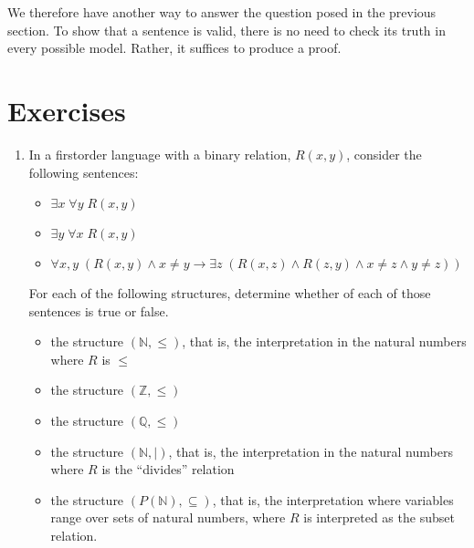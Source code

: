 \documentclass[letterpaper,10pt,english]{sphinxmanual}
\begin{document}
\sphinxAtStartPar
We therefore have another way to answer the question posed in the previous section. To show that a sentence is valid, there is no need to check its truth in every possible model. Rather, it suffices to produce a proof.


\section{Exercises}
\label{\detokenize{semantics_of_first_order_logic:exercises}}\begin{enumerate}
%
\item {} 
\sphinxAtStartPar
In a first\sphinxhyphen{}order language with a binary relation, \(R(x,y)\), consider the following sentences:
\begin{itemize}
\item {} 
\sphinxAtStartPar
\(\exists x \; \forall y \; R(x, y)\)

\item {} 
\sphinxAtStartPar
\(\exists y \; \forall x \; R(x, y)\)

\item {} 
\sphinxAtStartPar
\(\forall x,y \; (R(x,y) \wedge x \neq y \to \exists z \; (R(x,z) \wedge R(z,y) \wedge x \neq z \wedge y \neq z))\)

\end{itemize}

\sphinxAtStartPar
For each of the following structures, determine whether of each of
those sentences is true or false.
\begin{itemize}
\item {} 
\sphinxAtStartPar
the structure \((\mathbb N, \leq)\), that is, the interpretation in the natural numbers where \(R\) is \(\leq\)

\item {} 
\sphinxAtStartPar
the structure \((\mathbb Z, \leq)\)

\item {} 
\sphinxAtStartPar
the structure \((\mathbb Q, \leq)\)

\item {} 
\sphinxAtStartPar
the structure \((\mathbb N, \mid)\), that is, the interpretation in the natural numbers where \(R\) is the “divides” relation

\item {} 
\sphinxAtStartPar
the structure \((P(\mathbb N), \subseteq)\), that is, the interpretation where variables range over sets of natural numbers,
where \(R\) is interpreted as the subset relation.


\end{itemize}
\end{enumerate}
\end{document}
